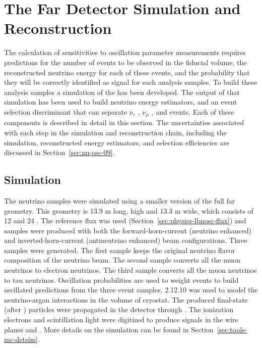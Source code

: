 \section{The Far Detector Simulation and Reconstruction}\label{sec:nu-osc-07}\label{sec:physics-lbnosc-FD}
\label{sec:physics-lbnosc-simreco}


The calculation of  sensitivities to oscillation parameter measurements requires predictions for the number of events to be observed in the  fiducial volume, the reconstructed neutrino energy for each of these events, and the probability that they will be correctly identified as signal for each analysis samples. To build these analysis samples a   simulation of the  has been developed. The output of that simulation has been used to build neutrino energy estimators, and an event selection discriminant that can separate $\nu_{e}$ , $\nu_{\mu}$ , and  events. Each of these components is described in detail in this section. The uncertainties associated with each step in the simulation and reconstruction chain, including the  simulation, reconstructed energy estimators, and selection efficiencies are discussed in Section~\ref{sec:nu-osc-09}. 


\subsection{Simulation}
The neutrino samples were simulated using a smaller version of the full \nominalmodsize far  geometry. This geometry is 13.9 m long, \tpcheight high and 13.3 m wide, which consists of 12  and 24 . The reference flux was used (Section~\ref{sec:physics-lbnosc-flux}) and samples were produced with both the forward-horn-current (neutrino enhanced) and inverted-horn-current (antineutrino enhanced) beam configurations. Three samples were generated. The first sample keeps the original neutrino flavor composition of  the neutrino beam. The second sample converts all the muon neutrinos to electron neutrinos. The third sample converts all the muon neutrinos to tau neutrinos. Oscillation probabilities are used to weight  events to build oscillated  predictions from the three event samples.  2.12.10 was used to model the neutrino-argon interactions in the volume of cryostat. The produced final-state (after ) particles were propagated in the detector through . %
The ionization electrons and scintillation light were digitized to produce signals in the wire planes and . More details on the simulation can be found in Section~\ref{sec:tools-mc-detsim}.

